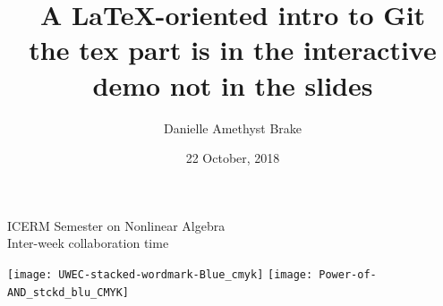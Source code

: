 \documentclass[14pt,aspectratio=1610]{beamer} %
\title[Git @ ICERM \hspace{2.5in} Brake]{A \LaTeX-oriented intro to Git \\  \small the tex part is in the interactive demo not in the slides}
\author{Danielle Amethyst Brake}
\date{22 October, 2018}
\begin{document}


\begin{frame}

 \titlepage
 
 \begin{center}
 ICERM Semester on Nonlinear Algebra \\ Inter-week collaboration time
\end{center}

  \texttt{[image: UWEC-stacked-wordmark-Blue\_cmyk]}
\hfill
 \texttt{[image: Power-of-AND\_stckd\_blu\_CMYK]}

\end{frame}















                                             
\end{document}
